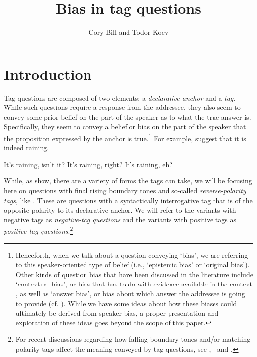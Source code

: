 \documentclass[output=paper,colorlinks,citecolor=brown]{langscibook}
\author{Cory Bill\affiliation{Leibniz-Zentrum Allgemeine Sprachwissenschaft (ZAS)}\orcid{0000-0003-0135-1745} and Todor Koev\affiliation{Ben-Gurion University of the Negev}\orcid{0000-0001-5510-1501}}
\title{Bias in tag questions}
\begin{document}
\maketitle

\section{Introduction} \label{sect:tagq:intro}
Tag questions are composed of two elements: a \textit{declarative anchor} and a \textit{tag}. While such questions require a response from the addressee, they also seem to convey some prior belief on the part of the speaker as to what the true answer is. Specifically, they seem to convey a belief or bias on the part of the speaker that the proposition expressed by the anchor is true.\footnote{Henceforth, when we talk about a question conveying `bias', we are referring to this speaker-oriented type of belief (i.e., `epistemic bias' or `original bias'). Other kinds of question bias that have been discussed in the literature include `contextual bias', or bias that has to do with evidence available in the context \citep{buring2000, romero2004, sudo2013, northrup2014, domaneschi2017}, as well as `answer bias', or bias about which answer the addressee is going to provide (cf. \citealt{krifka2015, Malamud2015, anderbois2019}). While we have some ideas about how these biases could ultimately be derived from speaker bias, a proper presentation and exploration of these ideas goes beyond the scope of this paper.} For example,  suggest that it is indeed raining.

\ea It's raining, isn't it?\label{TQ.1}
\ex It's raining, right?\label{TQ.2}
\ex It's raining, eh?\label{TQ.3}
\z
{}

\noindent
While, as  show, there are a variety of forms the tags can take, we will be focusing here on questions with final rising boundary tones and so-called \textit{reverse-polarity tags}, like . These are questions with a syntactically interrogative tag that is of the opposite polarity to its declarative anchor. We will refer to the variants with negative tags as \textit{negative-tag questions} and the variants with positive tags as \textit{positive-tag questions}.\footnote{For recent discussions regarding how falling boundary tones and/or matching-polarity tags affect the meaning conveyed by tag questions, see \citet{Reese2009}, \citet{Malamud2015}, and \citet{krifka2015}.}
\end{document}

